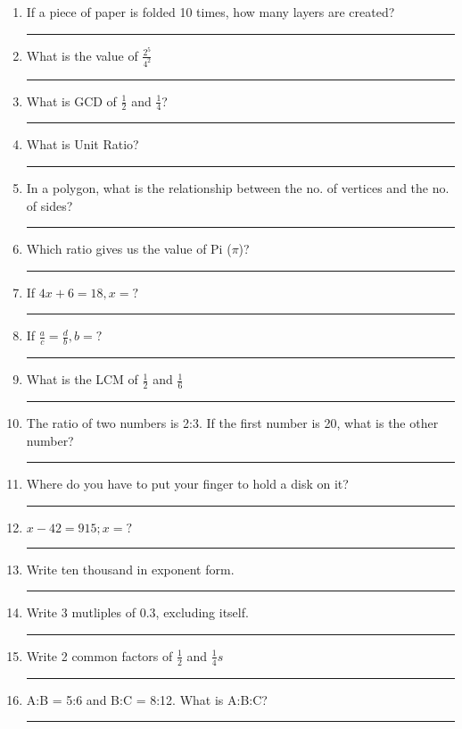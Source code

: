 \documentclass{exam}
\begin{document}
\begin{enumerate}

\item If a piece of paper is folded 10 times, how many layers are created? \noindent\rule{2cm}{0.4pt}

\item What is the value of $\frac{2^5}{4^2}$ \noindent\rule{2cm}{0.4pt}

\item What is GCD of $\frac12$ and $\frac14$? \noindent\rule{2cm}{0.4pt}

\item What is Unit Ratio? \noindent\rule{2cm}{0.4pt}

\item In a polygon, what is the relationship between the no. of vertices and
the no. of sides? \noindent\rule{2cm}{0.4pt}

\item Which ratio gives us the value of Pi ($\pi$)? \noindent\rule{2cm}{0.4pt}

\item If $4x+6 = 18, x = ?$  \noindent\rule{2cm}{0.4pt}

\item If $\frac ac = \frac db, b = ?$ \noindent\rule{2cm}{0.4pt}

\item What is the LCM of $\frac 12$ and $\frac 16$ \noindent\rule{2cm}{0.4pt}

\item The ratio of two numbers is 2:3. If the first number is 20, what is 
the other number? \noindent\rule{2cm}{0.4pt}

\item Where do you have to put your finger to hold a disk on it? \noindent\rule{2cm}{0.4pt}

\item $x - 42 = 915; x = ?$ \noindent\rule{2cm}{0.4pt}

\item Write ten thousand in exponent form. \noindent\rule{2cm}{0.4pt}

\item Write 3 mutliples of 0.3, excluding itself. \noindent\rule{2cm}{0.4pt}

\item Write 2 common factors of $\frac12$ and $\frac14s$ \noindent\rule{2cm}{0.4pt}

\item A:B = 5:6 and B:C = 8:12. What is A:B:C? \noindent\rule{2cm}{0.4pt}


\end{enumerate}
\end{document}
